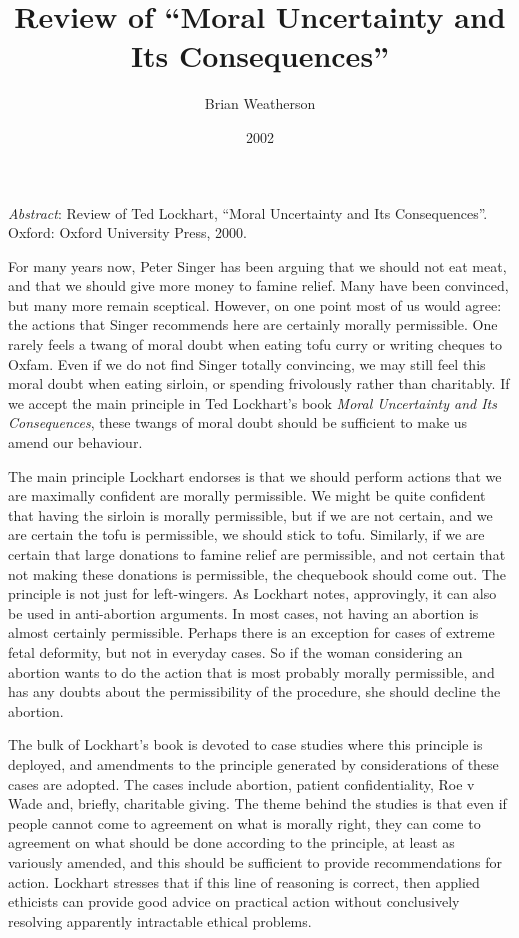 \documentclass[
  11pt,
  letterpaper,
  DIV=11,
  numbers=noendperiod,
  twoside]{scrartcl}
\title{Review of ``Moral Uncertainty and Its Consequences''}
\author{Brian Weatherson}
\date{2002}
\renewenvironment{abstract}
 {\vspace{-1.25cm}
 \quotation\small\noindent\emph{Abstract}:}
 {\endquotation}
\begin{document}
\maketitle
\begin{abstract}
Review of Ted Lockhart, ``Moral Uncertainty and Its Consequences''.
Oxford: Oxford University Press, 2000.
\end{abstract}


For many years now, Peter Singer has been arguing that we should not eat
meat, and that we should give more money to famine relief. Many have
been convinced, but many more remain sceptical. However, on one point
most of us would agree: the actions that Singer recommends here are
certainly morally permissible. One rarely feels a twang of moral doubt
when eating tofu curry or writing cheques to Oxfam. Even if we do not
find Singer totally convincing, we may still feel this moral doubt when
eating sirloin, or spending frivolously rather than charitably. If we
accept the main principle in Ted Lockhart's book \emph{Moral Uncertainty
and Its Consequences}, these twangs of moral doubt should be sufficient
to make us amend our behaviour.

The main principle Lockhart endorses is that we should perform actions
that we are maximally confident are morally permissible. We might be
quite confident that having the sirloin is morally permissible, but if
we are not certain, and we are certain the tofu is permissible, we
should stick to tofu. Similarly, if we are certain that large donations
to famine relief are permissible, and not certain that not making these
donations is permissible, the chequebook should come out. The principle
is not just for left-wingers. As Lockhart notes, approvingly, it can
also be used in anti-abortion arguments. In most cases, not having an
abortion is almost certainly permissible. Perhaps there is an exception
for cases of extreme fetal deformity, but not in everyday cases. So if
the woman considering an abortion wants to do the action that is most
probably morally permissible, and has any doubts about the
permissibility of the procedure, she should decline the abortion.

The bulk of Lockhart's book is devoted to case studies where this
principle is deployed, and amendments to the principle generated by
considerations of these cases are adopted. The cases include abortion,
patient confidentiality, Roe v Wade and, briefly, charitable giving. The
theme behind the studies is that even if people cannot come to agreement
on what is morally right, they can come to agreement on what should be
done according to the principle, at least as variously amended, and this
should be sufficient to provide recommendations for action. Lockhart
stresses that if this line of reasoning is correct, then applied
ethicists can provide good advice on practical action without
conclusively resolving apparently intractable ethical problems.
\end{document}

